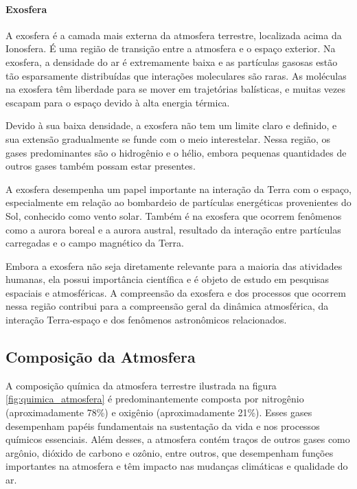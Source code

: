 \documentclass[a4paper, 12pt, onecolumn,singlespacing]{article}
\begin{document}
	\paragraph{Exosfera} A exosfera é a camada mais externa da atmosfera terrestre, localizada acima da Ionosfera. É uma região de transição entre a atmosfera e o espaço exterior. Na exosfera, a densidade do ar é extremamente baixa e as partículas gasosas estão tão esparsamente distribuídas que interações moleculares são raras. As moléculas na exosfera têm liberdade para se mover em trajetórias balísticas, e muitas vezes escapam para o espaço devido à alta energia térmica.
	
	Devido à sua baixa densidade, a exosfera não tem um limite claro e definido, e sua extensão gradualmente se funde com o meio interestelar. Nessa região, os gases predominantes são o hidrogênio e o hélio, embora pequenas quantidades de outros gases também possam estar presentes.
	
	A exosfera desempenha um papel importante na interação da Terra com o espaço, especialmente em relação ao bombardeio de partículas energéticas provenientes do Sol, conhecido como vento solar. Também é na exosfera que ocorrem fenômenos como a aurora boreal e a aurora austral, resultado da interação entre partículas carregadas e o campo magnético da Terra.
	
	Embora a exosfera não seja diretamente relevante para a maioria das atividades humanas, ela possui importância científica e é objeto de estudo em pesquisas espaciais e atmosféricas. A compreensão da exosfera e dos processos que ocorrem nessa região contribui para a compreensão geral da dinâmica atmosférica, da interação Terra-espaço e dos fenômenos astronômicos relacionados.
	
	\subsection{Composição da Atmosfera}
	
	A composição química da atmosfera terrestre ilustrada na figura \ref{fig:quimica_atmosfera} é predominantemente composta por nitrogênio (aproximadamente 78\%) e oxigênio (aproximadamente 21\%). Esses gases desempenham papéis fundamentais na sustentação da vida e nos processos químicos essenciais. Além desses, a atmosfera contém traços de outros gases como argônio, dióxido de carbono e ozônio, entre outros, que desempenham funções importantes na atmosfera e têm impacto nas mudanças climáticas e qualidade do ar. 
	
\end{document}
